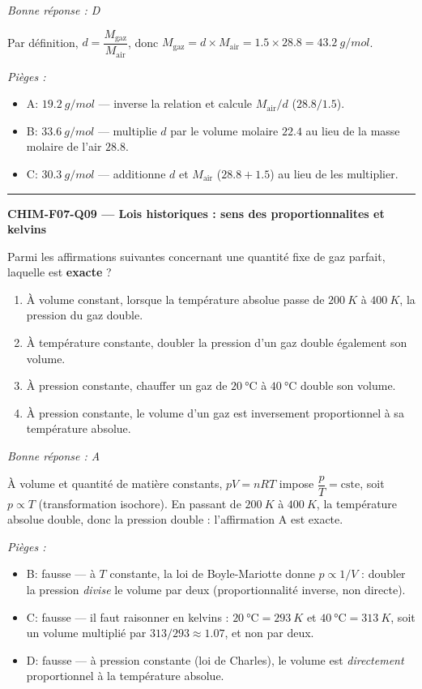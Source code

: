 \documentclass[11pt,a4paper]{article}
\begin{document}
\textit{Bonne réponse : D}\par
Par définition, $d=\dfrac{M_{\text{gaz}}}{M_{\text{air}}}$, donc $M_{\text{gaz}}=d\times M_{\text{air}}=\num{1.5}\times\num{28.8}=\qty{43.2}{g/mol}$.\par
\textit{Pièges :}
\begin{itemize}
\item A: $\qty{19.2}{g/mol}$ --- inverse la relation et calcule $M_{\text{air}}/d$ ($\num{28.8}/\num{1.5}$).
\item B: $\qty{33.6}{g/mol}$ --- multiplie $d$ par le volume molaire $\num{22.4}$ au lieu de la masse molaire de l'air $\num{28.8}$.
\item C: $\qty{30.3}{g/mol}$ --- additionne $d$ et $M_{\text{air}}$ ($\num{28.8}+\num{1.5}$) au lieu de les multiplier.
\end{itemize}
\vspace{8pt}\hrule\vspace{8pt}
\noindent\textbf{CHIM-F07-Q09 --- Lois historiques : sens des proportionnalites et kelvins}\par
Parmi les affirmations suivantes concernant une quantité fixe de gaz parfait, laquelle est \textbf{exacte} ?
\begin{enumerate}[label=\Alph*)]
\item À volume constant, lorsque la température absolue passe de $\qty{200}{K}$ à $\qty{400}{K}$, la pression du gaz double.
\item À température constante, doubler la pression d'un gaz double également son volume.
\item À pression constante, chauffer un gaz de $\qty{20}{\degreeCelsius}$ à $\qty{40}{\degreeCelsius}$ double son volume.
\item À pression constante, le volume d'un gaz est inversement proportionnel à sa température absolue.
\end{enumerate}
\textit{Bonne réponse : A}\par
À volume et quantité de matière constants, $pV=nRT$ impose $\dfrac{p}{T}=\text{cste}$, soit $p\propto T$ (transformation isochore). En passant de $\qty{200}{K}$ à $\qty{400}{K}$, la température absolue double, donc la pression double : l'affirmation A est exacte.\par
\textit{Pièges :}
\begin{itemize}
\item B: fausse --- à $T$ constante, la loi de Boyle-Mariotte donne $p\propto 1/V$ : doubler la pression \emph{divise} le volume par deux (proportionnalité inverse, non directe).
\item C: fausse --- il faut raisonner en kelvins : $\qty{20}{\degreeCelsius}=\qty{293}{K}$ et $\qty{40}{\degreeCelsius}=\qty{313}{K}$, soit un volume multiplié par $313/293\approx\num{1.07}$, et non par deux.
\item D: fausse --- à pression constante (loi de Charles), le volume est \emph{directement} proportionnel à la température absolue.
\end{itemize}
\end{document}
